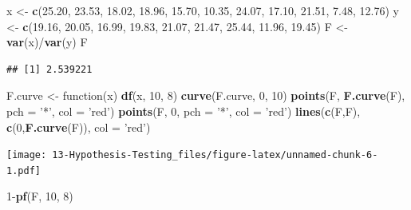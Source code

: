 \documentclass[]{book}
\newenvironment{Shaded}{\begin{snugshade}}{\end{snugshade}}
\newcommand{\KeywordTok}[1]{\textcolor[rgb]{0.13,0.29,0.53}{\textbf{{#1}}}}
\newcommand{\DataTypeTok}[1]{\textcolor[rgb]{0.13,0.29,0.53}{{#1}}}
\newcommand{\DecValTok}[1]{\textcolor[rgb]{0.00,0.00,0.81}{{#1}}}
\newcommand{\FloatTok}[1]{\textcolor[rgb]{0.00,0.00,0.81}{{#1}}}
\newcommand{\StringTok}[1]{\textcolor[rgb]{0.31,0.60,0.02}{{#1}}}
\newcommand{\NormalTok}[1]{{#1}}
\begin{document}
\begin{Shaded}
\begin{Highlighting}[]
\NormalTok{x <-}\StringTok{ }\KeywordTok{c}\NormalTok{(}\FloatTok{25.20}\NormalTok{, }\FloatTok{23.53}\NormalTok{, }\FloatTok{18.02}\NormalTok{, }\FloatTok{18.96}\NormalTok{, }\FloatTok{15.70}\NormalTok{, }\FloatTok{10.35}\NormalTok{, }\FloatTok{24.07}\NormalTok{, }\FloatTok{17.10}\NormalTok{, }\FloatTok{21.51}\NormalTok{,  }\FloatTok{7.48}\NormalTok{, }\FloatTok{12.76}\NormalTok{)}
\NormalTok{y <-}\StringTok{ }\KeywordTok{c}\NormalTok{(}\FloatTok{19.16}\NormalTok{, }\FloatTok{20.05}\NormalTok{, }\FloatTok{16.99}\NormalTok{, }\FloatTok{19.83}\NormalTok{, }\FloatTok{21.07}\NormalTok{, }\FloatTok{21.47}\NormalTok{, }\FloatTok{25.44}\NormalTok{, }\FloatTok{11.96}\NormalTok{, }\FloatTok{19.45}\NormalTok{)}
\NormalTok{F <-}\StringTok{ }\KeywordTok{var}\NormalTok{(x)/}\KeywordTok{var}\NormalTok{(y)}
\NormalTok{F}
\end{Highlighting}
\end{Shaded}

\begin{verbatim}
## [1] 2.539221
\end{verbatim}

\begin{Shaded}
\begin{Highlighting}[]
\NormalTok{F.curve <-}\StringTok{ }\NormalTok{function(x) }\KeywordTok{df}\NormalTok{(x, }\DecValTok{10}\NormalTok{, }\DecValTok{8}\NormalTok{)}
\KeywordTok{curve}\NormalTok{(F.curve, }\DecValTok{0}\NormalTok{, }\DecValTok{10}\NormalTok{)}
\KeywordTok{points}\NormalTok{(F, }\KeywordTok{F.curve}\NormalTok{(F), }\DataTypeTok{pch =} \StringTok{'*'}\NormalTok{, }\DataTypeTok{col =} \StringTok{'red'}\NormalTok{)}
\KeywordTok{points}\NormalTok{(F, }\DecValTok{0}\NormalTok{, }\DataTypeTok{pch =} \StringTok{'*'}\NormalTok{, }\DataTypeTok{col =} \StringTok{'red'}\NormalTok{)}
\KeywordTok{lines}\NormalTok{(}\KeywordTok{c}\NormalTok{(F,F), }\KeywordTok{c}\NormalTok{(}\DecValTok{0}\NormalTok{,}\KeywordTok{F.curve}\NormalTok{(F)), }\DataTypeTok{col =} \StringTok{'red'}\NormalTok{)}
\end{Highlighting}
\end{Shaded}

\texttt{[image: 13-Hypothesis-Testing\_files/figure-latex/unnamed-chunk-6-1.pdf]}

\begin{Shaded}
\begin{Highlighting}[]
\DecValTok{1}\NormalTok{-}\KeywordTok{pf}\NormalTok{(F, }\DecValTok{10}\NormalTok{, }\DecValTok{8}\NormalTok{)}
\end{Highlighting}
\end{Shaded}
\end{document}
